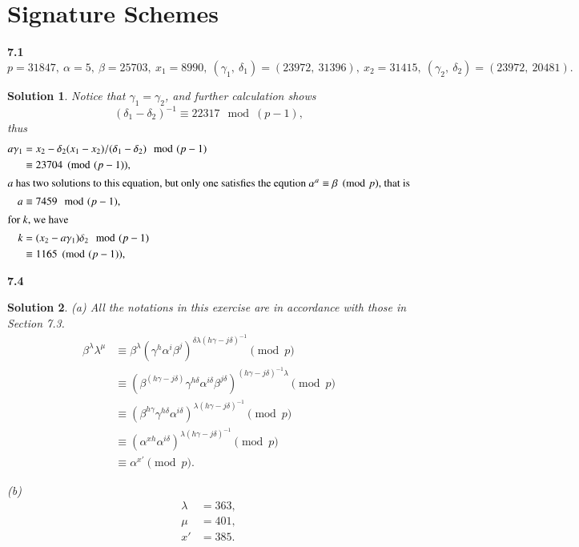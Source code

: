 \documentclass[12pt,a4paper]{article}
\theoremstyle{solution}
\newtheorem*{sol}{Solution}
\begin{document}
\section{Signature Schemes}

\textbf{7.1}
$p=31847,~\alpha=5,~\beta=25703,~x_1=8990,~(\gamma_1,~\delta_1)=(23972,~31396),~x_2=31415,~(\gamma_2,~\delta_2)=(23972,~20481).$

\begin{sol}
Notice that $\gamma_1=\gamma_2$, and further calculation shows
$$(\delta_1-\delta_2)^{-1} \equiv 22317 \mod (p-1),$$
thus
\begin{align*}
a\gamma_1 &= x_2-\delta_2(x_1-x_2)/(\delta_1-\delta_2) \mod(p-1) \\
&\equiv 23704 \pmod{(p-1)},\\
\intertext{$a$ has two solutions to this equation, but only one satisfies the eqution $\alpha^a\equiv \beta \pmod{p}$, that is}
a&\equiv7459\mod(p-1), \\
\intertext{for $k$, we have}
k&=(x_2-a\gamma_1)\delta_2 \mod(p-1) \\
&\equiv  1165 \pmod{(p-1)},\\
\end{align*}
\end{sol}

\textbf{7.4}

\begin{sol}
(a) All the notations in this exercise are in accordance with those in Section 7.3.
\begin{align*}
\beta^{\lambda}\lambda^\mu & \equiv \beta^\lambda (\gamma^h \alpha^i \beta^j)^{\delta\lambda(h\gamma-j\delta)^{-1}} \pmod{p}\\
    &\equiv (\beta^{(h\gamma-j\delta)} \gamma^{h\delta} \alpha^{i\delta}\beta^{j\delta})^{(h\gamma-j\delta)^{-1}\lambda} \pmod{p}\\
    &\equiv (\beta^{h\gamma}\gamma^{h\delta}\alpha^{i\delta})^{\lambda(h\gamma-j\delta)^{-1}} \pmod{p}\\
    &\equiv (\alpha^{xh}\alpha^{i\delta})^{\lambda(h\gamma-j\delta)^{-1}} \pmod{p}\\
    &\equiv \alpha^{x'} \pmod{p}.
\end{align*}

(b)
\begin{align*}
\lambda&=363,\\
\mu &=401,\\
x' &=385.
\end{align*}
\end{sol}
\end{document}
